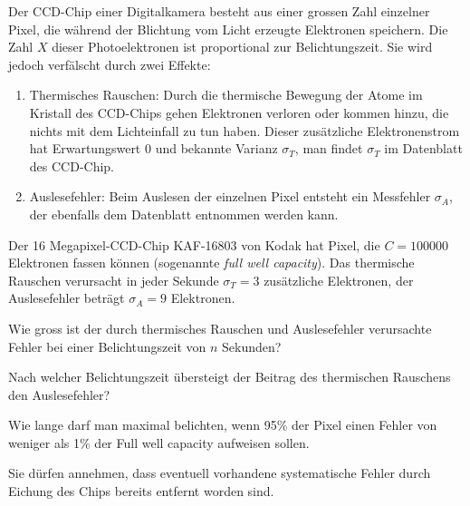 Der CCD-Chip einer Digitalkamera besteht aus einer grossen Zahl einzelner
Pixel, die während der Blichtung vom Licht erzeugte Elektronen speichern.
Die Zahl $X$ dieser Photoelektronen ist proportional zur Belichtungszeit.
Sie wird jedoch verfälscht durch zwei Effekte:
\begin{enumerate}
\item
Thermisches Rauschen: Durch die thermische Bewegung der Atome
im Kristall des CCD-Chips gehen Elektronen verloren oder kommen hinzu,
die nichts mit dem Lichteinfall zu tun haben. Dieser zusätzliche
Elektronenstrom hat Erwartungswert $0$ und bekannte Varianz $\sigma_T$,
man findet $\sigma_T$ im Datenblatt des CCD-Chip.
\item
Auslesefehler: Beim Auslesen der einzelnen Pixel entsteht ein Messfehler
$\sigma_A$, der ebenfalls dem Datenblatt entnommen werden kann.
\end{enumerate}
Der 16 Megapixel-CCD-Chip KAF-16803 von Kodak hat Pixel, die $C = 100000$
Elektronen fassen können (sogenannte {\it full well capacity}).
Das thermische Rauschen verursacht in jeder
Sekunde $\sigma_T = 3$ zusätzliche Elektronen, der Auslesefehler
beträgt $\sigma_A=9$ Elektronen.
\begin{teilaufgaben}
\item Wie gross ist der durch thermisches Rauschen und Auslesefehler
verursachte Fehler bei einer Belichtungszeit von $n$ Sekunden?
\item Nach welcher Belichtungszeit übersteigt der Beitrag des
thermischen Rauschens den Auslesefehler?
\item Wie lange darf man maximal belichten, wenn 95\% der Pixel einen Fehler
von weniger als 1\% der Full well capacity aufweisen sollen.
\end{teilaufgaben}

\begin{hinweis}
Sie dürfen annehmen, dass eventuell vorhandene systematische
Fehler durch Eichung des Chips bereits entfernt worden sind.
\end{hinweis}

